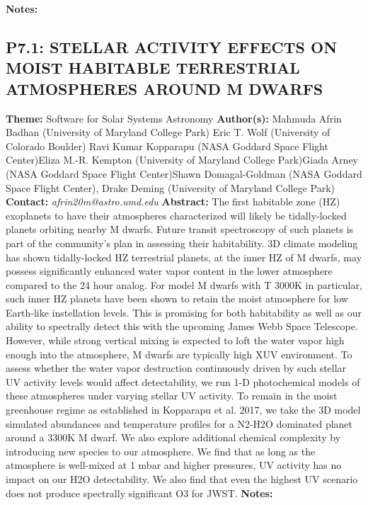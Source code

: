 \documentclass{report}
\begin{document}
{\bf Notes:}\newline
{\newpage
\subsection*{P7.1: STELLAR ACTIVITY EFFECTS ON MOIST HABITABLE TERRESTRIAL ATMOSPHERES AROUND M DWARFS}
{\bf Theme:}  Software for Solar Systems Astronomy\newline
{\bf Author(s):}\newline
Mahmuda Afrin Badhan (University of Maryland College Park) \newline Eric T. Wolf (University of Colorado Boulder) \newline  Ravi Kumar Kopparapu (NASA Goddard Space Flight Center)\newline  Eliza M.-R. Kempton (University of Maryland College Park)\newline Giada Arney (NASA Goddard Space Flight Center)\newline  Shawn Domagal-Goldman (NASA Goddard Space Flight Center), Drake Deming (University of Maryland College Park)\newline\newline
{\bf Contact:} {\it afrin20m@astro.umd.edu}\newline
\newline\newline
{\bf Abstract:}\newline
The first habitable zone (HZ) exoplanets to have their atmospheres characterized will likely be tidally-locked planets orbiting nearby M dwarfs. Future transit spectroscopy of such planets is part of the community’s plan in assessing their habitability. 3D climate modeling has shown tidally-locked HZ terrestrial planets, at the inner HZ of M dwarfs, may possess significantly enhanced water vapor content in the lower atmosphere compared to the 24 hour analog. For model M dwarfs with T  3000K in particular, such inner HZ planets have been shown to retain the moist atmosphere for low Earth-like instellation levels. This is promising for both habitability as well as our ability to spectrally detect this with the upcoming James Webb Space Telescope. However, while strong vertical mixing is expected to loft the water vapor high enough into the atmosphere, M dwarfs are typically high XUV environment. To assess whether the water vapor destruction continuously driven by such stellar UV activity levels would affect detectability, we run 1-D photochemical models of these atmospheres under varying stellar UV activity. To remain in the moist greenhouse regime as established in Kopparapu et al. 2017, we take the 3D model simulated abundances and temperature profiles for a N2-H2O dominated planet around a 3300K M dwarf. We also explore additional chemical complexity by introducing new species to our atmosphere. We find that as long as the atmosphere is well-mixed at 1 mbar and higher pressures, UV activity has no impact on our H2O detectability. We also find that even the highest UV scenario does not produce spectrally significant O3 for JWST.\newline
{\bf Notes:}\newline
{\newpage
}}
\end{document}
